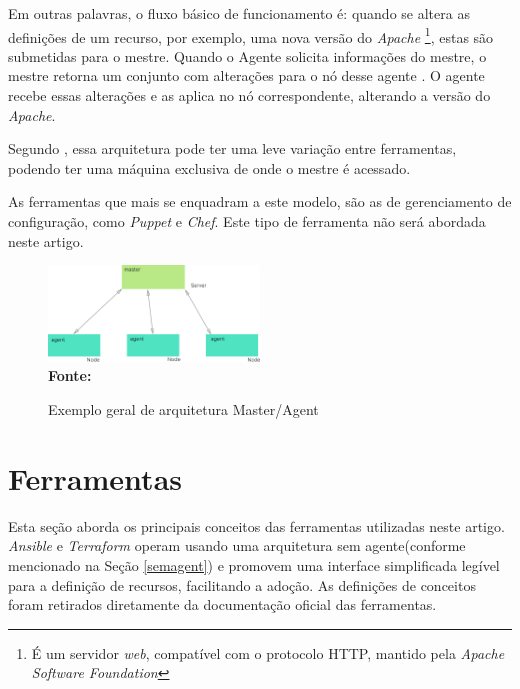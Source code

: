  Em outras palavras, o fluxo básico de funcionamento é: quando se altera as definições de um recurso, por exemplo, uma nova versão do \textit{Apache} \footnote{É um servidor \textit{web}, compatível com o protocolo HTTP, mantido pela \textit{Apache Software Foundation }}, estas são submetidas para o mestre. Quando o Agente solicita informações do mestre, o mestre retorna um conjunto com alterações para o nó desse agente . O agente recebe essas alterações e as aplica no nó correspondente, alterando a versão do \textit{Apache}.   

Segundo \cite{Morris:2016:ICM:3006361}, essa arquitetura pode ter uma leve variação entre ferramentas, podendo ter uma máquina exclusiva de onde o mestre é acessado.

As ferramentas que mais se enquadram a este modelo, são as de gerenciamento de configuração, como \textit{Puppet} e \textit{Chef}. Este tipo de ferramenta não será abordada neste artigo. 
 
 \begin{figure}[ht]
	\centering	
	\caption[\hspace{0.1cm}Exemplo arquitetura Master/Agent]{Exemplo geral de arquitetura Master/Agent}
	\vspace{-0.4cm}
	\includegraphics[width=0.5\textwidth]{figuras/master-agent.png}
	 \vspace{-0.2cm}
	\\\textbf{\footnotesize Fonte: \cite{Harit}}
	\label{fig:figura4}
\end{figure}
\vspace{-0.5cm}

\section{Ferramentas}

Esta seção aborda os principais conceitos das ferramentas utilizadas neste artigo. \textit{Ansible} e \textit{Terraform} operam usando uma arquitetura sem agente(conforme mencionado na Seção \ref{semagent}) e promovem uma interface simplificada legível para a definição de recursos, facilitando a adoção. As definições de conceitos foram retirados diretamente da documentação oficial das ferramentas.

